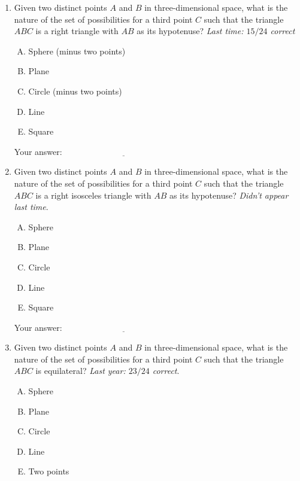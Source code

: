 \documentclass[10pt]{amsart}
\begin{document}
\begin{enumerate}
\item Given two distinct points $A$ and $B$ in three-dimensional
  space, what is the nature of the set of possibilities for a third
  point $C$ such that the triangle $ABC$ is a right triangle with $AB$
  as its hypotenuse? {\em Last time: $15/24$ correct}

  \begin{enumerate}[(A)]
  \item Sphere (minus two points)
  \item Plane
  \item Circle (minus two points)
  \item Line
  \item Square
  \end{enumerate}

  \vspace{0.1in}
  Your answer: $\underline{\qquad\qquad\qquad\qquad\qquad\qquad\qquad}$
  \vspace{0.1in}

\item Given two distinct points $A$ and $B$ in three-dimensional
  space, what is the nature of the set of possibilities for a third
  point $C$ such that the triangle $ABC$ is a right isosceles triangle
  with $AB$ as its hypotenuse? {\em Didn't appear last time}.

  \begin{enumerate}[(A)]
  \item Sphere
  \item Plane
  \item Circle
  \item Line
  \item Square
  \end{enumerate}

  \vspace{0.1in}
  Your answer: $\underline{\qquad\qquad\qquad\qquad\qquad\qquad\qquad}$
  \vspace{0.1in}

\item Given two distinct points $A$ and $B$ in three-dimensional
  space, what is the nature of the set of possibilities for a third
  point $C$ such that the triangle $ABC$ is equilateral? {\em Last
  year: $23/24$ correct}.

  \begin{enumerate}[(A)]
  \item Sphere
  \item Plane
  \item Circle
  \item Line
  \item Two points
  \end{enumerate}


\end{enumerate}
\end{document}
